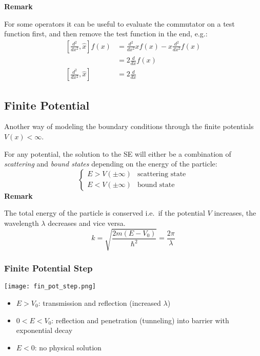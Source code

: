 \textbf{Remark}

For some operators it can be useful to evaluate the commutator on a test function first, and then remove the test function in the end, e.g.:
\noindent\begin{align*}
    \left[\frac{d^2}{dx^2}, \hat{x}\right] f(x) & = \frac{d^2}{dx^2} xf(x) - x\frac{d^2}{dx^2}f(x) \\
                                                & = 2\frac{d}{dx} f(x)                             \\
    \left[\frac{d^2}{dx^2}, \hat{x}\right]      & = 2\frac{d}{dx}
\end{align*}

\subsection{Finite Potential}
Another way of modeling the boundary conditions through the finite potentials $V(x) < \infty$.

For any potential, the solution to the SE will either be a combination of \textit{scattering} and \textit{bound states} depending on the energy of the particle:
\noindent\begin{equation*}
    \begin{cases}
        E > V(\pm \infty) & \text{scattering state} \\
        E < V(\pm \infty) & \text{bound state}
    \end{cases}
\end{equation*}
\textbf{Remark}

The total energy of the particle is conserved i.e.\ if the potential $V$ increases, the wavelength $\lambda$ decreases and vice versa.
\noindent\begin{equation*}
    k=\sqrt{\frac{2m(E-V_0)}{\hbar^2}} = \frac{2\pi}{\lambda}
\end{equation*}

\subsubsection{Finite Potential Step}
\begin{center}
    \texttt{[image: fin\_pot\_step.png]}
\end{center}
\begin{itemize}
    \item $E>V_0$: transmission and reflection (increased $\lambda$)
    \item $0<E<V_0$: reflection and penetration (tunneling) into barrier with exponential decay
    \item $E<0$: no physical solution
\end{itemize}

